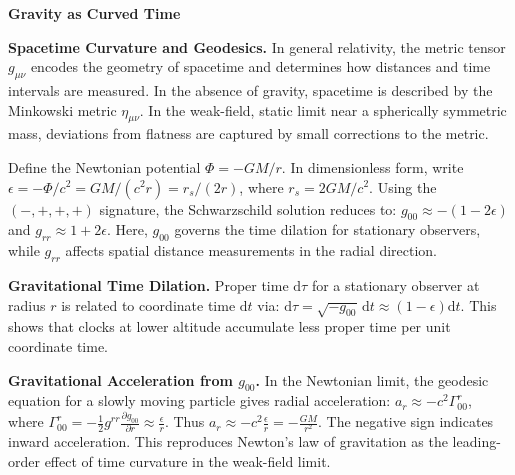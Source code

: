 \begin{technical}

{\Large\textbf{Gravity as Curved Time}}

\textbf{Spacetime Curvature and Geodesics.}  
In general relativity, the metric tensor \( g_{\mu\nu} \) encodes the geometry of spacetime and determines how distances and time intervals are measured. In the absence of gravity, spacetime is described by the Minkowski metric \( \eta_{\mu\nu} \). In the weak-field, static limit near a spherically symmetric mass, deviations from flatness are captured by small corrections to the metric. 

Define the Newtonian potential \( \Phi = -GM/r \). In dimensionless form, write \( \epsilon = -\Phi/c^2 = GM/(c^2 r) = r_s/(2r) \), where \( r_s = 2GM/c^2 \). 
Using the \( (-,+,+,+) \) signature, the Schwarzschild solution reduces to: \( g_{00} \approx -(1 - 2\epsilon) \) and \( g_{rr} \approx 1 + 2\epsilon \).
Here, \( g_{00} \) governs the time dilation for stationary observers, while \( g_{rr} \) affects spatial distance measurements in the radial direction.

\textbf{Gravitational Time Dilation.}  
Proper time \( \mathrm{d}\tau \) for a stationary observer at radius \( r \) is related to coordinate time \( \mathrm{d}t \) via: \( \mathrm{d}\tau = \sqrt{-g_{00}}\, \mathrm{d}t \approx (1 - \epsilon) \mathrm{d}t \).
This shows that clocks at lower altitude accumulate less proper time per unit coordinate time.

\textbf{Gravitational Acceleration from \( g_{00} \).}
In the Newtonian limit, the geodesic equation for a slowly moving particle gives radial acceleration: \( a_r \approx -c^2 \Gamma^r_{00} \), where \( \Gamma^r_{00} = -\frac{1}{2} g^{rr} \frac{\partial g_{00}}{\partial r} \approx \frac{\epsilon}{r} \).
Thus \( a_r \approx -c^2 \frac{\epsilon}{r} = -\frac{GM}{r^2} \).
The negative sign indicates inward acceleration. This reproduces Newton's law of gravitation as the leading-order effect of time curvature in the weak-field limit.


\end{technical}
